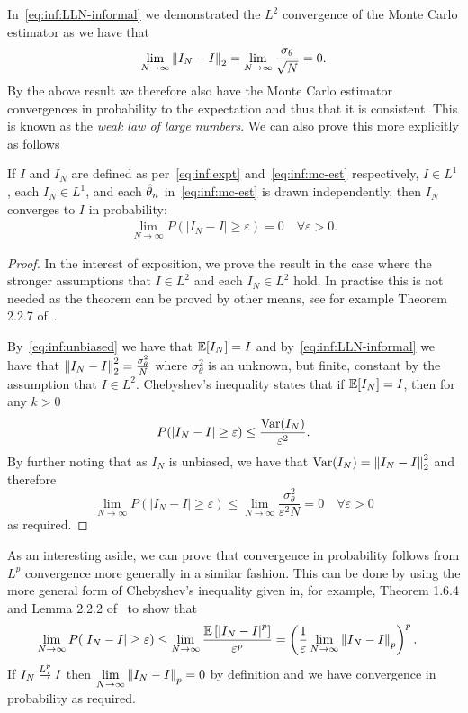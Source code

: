 In~\eqref{eq:inf:LLN-informal} we demonstrated the $L^2$ convergence of the Monte Carlo
estimator as we have that 
\[
\lim\limits_{N\rightarrow\infty} \left\lVert I_N-I\right\rVert_2=\lim\limits_{N\rightarrow\infty} \frac{\sigma_\theta}{\sqrt{N}} = 0.
\]
By the above result we therefore also have the Monte Carlo estimator convergences in
probability to the expectation and thus that it is consistent.  This is known as the
\emph{weak law of large numbers}.  We can also prove this more explicitly as follows
\begin{theorem}
	\label{the:inf:weak-law}
If $I$ and $I_N$ are defined as per~\eqref{eq:inf:expt} and~\eqref{eq:inf:mc-est} respectively,
$I\in L^1$, each $I_N \in L^1$,
 and each $\hat{\theta}_n$ in~\eqref{eq:inf:mc-est} is drawn independently, then $I_N$ converges to $I$
in probability:
\begin{align}
	\lim\limits_{N\rightarrow\infty} P(\left|I_N-I\right|\ge \varepsilon)=0 \quad \forall \varepsilon>0.
\end{align}
\end{theorem}
\begin{proof}
In the interest of exposition, we prove the result in the case where the stronger 
assumptions that $I\in L^2$ and each $I_N \in L^2$ hold.  In practise this is not needed as
the theorem can be proved by other means, see for example Theorem 2.2.7 of~\cite{durrett2010probability}.

By~\eqref{eq:inf:unbiased} we have that $\mathbb{E} [I_N]=I$ and by~\eqref{eq:inf:LLN-informal} we have that 
$\left\lVert I_N-I\right\rVert_2^2 = \frac{\sigma_{\theta}^2}{N}$
where $\sigma_{\theta}^2$ is an unknown, but finite, constant by the assumption that $I\in L^2$.
Chebyshev's inequality states that if $\mathbb{E} [I_N] = I$, then for any $k>0$
\[
P(\left|I_N-I\right|\ge\varepsilon)\le\frac{\mathrm{Var}(I_N)}{\varepsilon^2}.
\]
By further noting that as $I_N$ is unbiased, we have that $\mathrm{Var}(I_N) = \left\lVert I_N-I\right\rVert_2^2$
and therefore
\[
\lim\limits_{N\rightarrow\infty} P(\left|I_N-I\right|\ge\varepsilon)
\le\lim\limits_{N\rightarrow\infty} \frac{\sigma_{\theta}^2}{\varepsilon^2 N}
=0 \quad \forall \varepsilon>0
\]
as required.
\end{proof}
As an interesting aside, we can prove that convergence in probability follows from
$L^p$ convergence more generally in a similar fashion.  This can be done
by using the more general form of Chebyshev's inequality given in, for example,
Theorem 1.6.4 and Lemma 2.2.2 of~\cite{durrett2010probability} to show that
\begin{align}
\label{eq:inf:prob-from-lp}
\begin{split}
\lim\limits_{N\rightarrow\infty} P(\left|I_N-I\right|\ge\varepsilon)
&\le \lim\limits_{N\rightarrow\infty} \frac{\mathbb{E} \left[\left|I_N-I\right|^{p}\right]}{\varepsilon^p} = 
\left(\frac{1}{\varepsilon}\lim\limits_{N\rightarrow\infty} \left\lVert I_N-I\right\rVert_p\right)^p.
\end{split}
\end{align}
If $I_N \overset{L^p}{\to} I$ then $\lim\limits_{N\rightarrow\infty} \left\lVert I_N-I\right\rVert_p = 0$ by definition
and we have convergence in probability as required.

